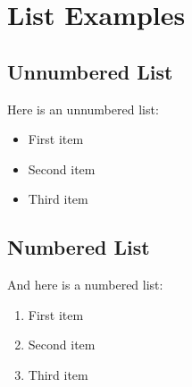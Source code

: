 \section{List Examples}

\subsection{Unnumbered List}
Here is an unnumbered list:
\begin{itemize}
    \item First item
    \item Second item
    \item Third item
\end{itemize}

\subsection{Numbered List}
And here is a numbered list:
\begin{enumerate}
    \item First item
    \item Second item
    \item Third item
\end{enumerate}